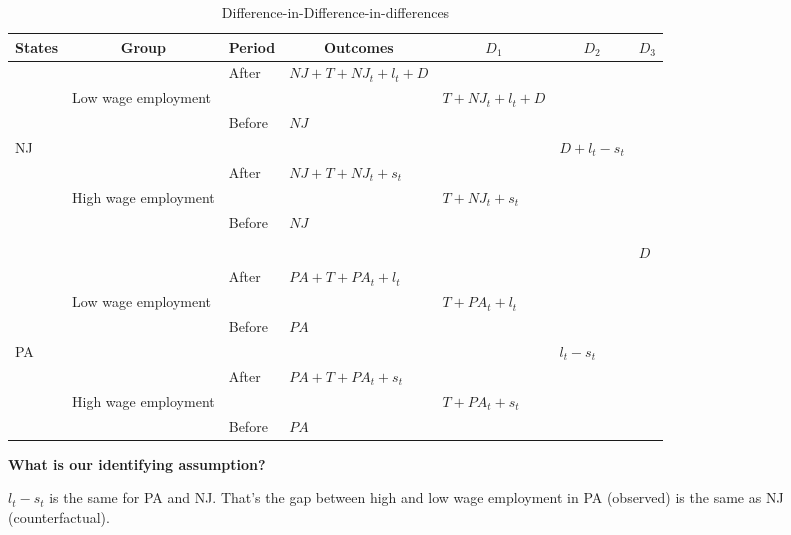\documentclass{beamer}
\begin{document}
\begin{frame}[shrink=20]

\begin{table}\centering
		\caption{Difference-in-Difference-in-differences}
		\tiny
		\begin{center}
		\begin{tabular}{lll|l|lll}
		\hline \hline
		\multicolumn{1}{l}{\textbf{States}}&
		\multicolumn{1}{c}{\textbf{Group}}&
		\multicolumn{1}{c}{\textbf{Period}}&
		\multicolumn{1}{c}{\textbf{Outcomes}}&
		\multicolumn{1}{c}{$D_1$}&
		\multicolumn{1}{c}{$D_2$}&
		\multicolumn{1}{c}{$D_3$}\\
		\hline
		&&After	&$NJ+T+NJ_t+l_t+D$					\\
	&Low wage employment			&&&$T+NJ_t+l_t+D$			\\
		&&Before	&$NJ$					\\
NJ					&&&&&$D+l_t-s_t$			\\
		&&After	&$NJ+T+NJ_t+s_t$					\\
	&High wage employment		&&	&$T+NJ_t+s_t$				\\
		&&Before	&$NJ$					\\
								\\
&&&&&&$D$
\\
		&&After	&$PA+T+PA_t+l_t$				\\
	&Low wage employment			&&&$T+PA_t+l_t$ \\				
		&&Before	&$PA$					\\
PA					&&&&&$l_t-s_t$		\\
		&&After	&$PA+T+PA_t+s_t$					\\
	&High wage employment		&&&	$T+PA_t+s_t$				\\
		&&Before	&$PA$					\\
		\hline \hline
		\end{tabular}
		\end{center}
	\end{table}
	
\textbf{What is our identifying assumption?}

\bigskip

$l_t-s_t$ is the same for PA and NJ. That's the gap between high and low wage employment in PA (observed) is the same as NJ (counterfactual).



\end{frame}
\end{document}
